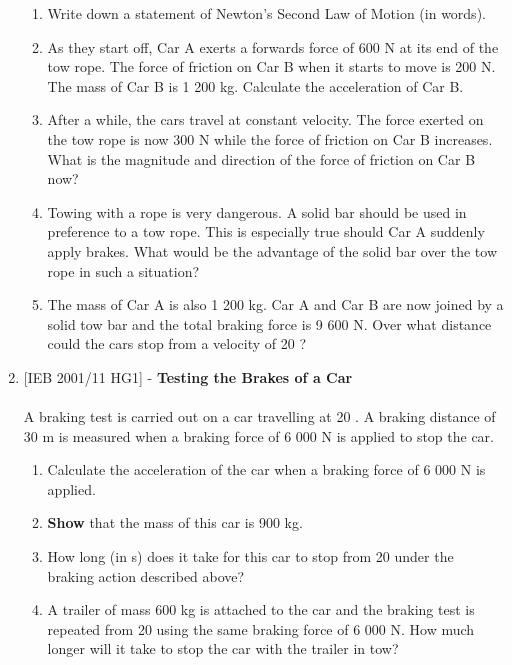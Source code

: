 \begin{enumerate}
{\begin{enumerate}
\item{Write down a statement of Newton's Second Law of Motion (in words).}
\item{As they start off, Car A exerts a forwards force of 600 N at its end of the tow rope. The force of friction on Car B when it starts to move is 200 N. The mass of Car B is 1 200 kg. Calculate the acceleration of Car B.}
\item{After a while, the cars travel at constant velocity. The force exerted on the tow rope is now 300 N while the force of friction on Car B increases. What is the magnitude and direction of the force of friction on Car B now?}
\item{Towing with a rope is very dangerous. A solid bar should be used in preference to a tow rope. This is especially true should Car A suddenly apply brakes. What would be the advantage of the solid bar over the tow rope in such a situation?}
\item{The mass of Car A is also 1 200 kg. Car A and Car B are now joined by a solid tow bar and the total braking force is 9 600 N. Over what distance could the cars stop from a velocity of 20 \ms?}
\end{enumerate}}

\item{[IEB 2001/11 HG1] - \textbf{Testing the Brakes of a Car}\\
\\
A braking test is carried out on a car travelling at 20 \ms. A braking distance of 30 m is measured when a braking force of 6 000 N is applied to stop the car.
\begin{enumerate}
\item{Calculate the acceleration of the car when a braking force of 6 000 N is applied.}
\item{\textbf{Show} that the mass of this car is 900 kg.}
\item{How long (in s) does it take for this car to stop from 20 \ms under the braking action described above?}
\item{ A trailer of mass 600 kg is attached to the car and the braking test is repeated from 20 \ms using the same braking force of 6 000 N. How much longer will it take to stop the car with the trailer in tow?}
\end{enumerate}}


\end{enumerate}
